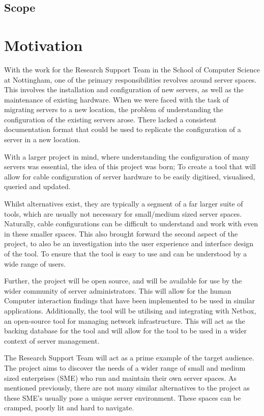 \documentclass [12pt,letterpaper]{article}
\begin{document}
\subsection{Scope}
\label{sec:scope}


\section{Motivation}
With the work for the Research Support Team in the School of Computer Science at Nottingham, one of the primary responsibilities revolves around server spaces. This involves the installation and configuration of new servers, as well as the maintenance of existing hardware. When we were faced with the task of migrating servers to a new location, the problem of understanding the configuration of the existing servers arose. There lacked a consistent documentation format that could be used to replicate the configuration of a server in a new location.

With a larger project in mind, where understanding the configuration of many servers was essential, the idea of this project was born; To create a tool that will allow for cable configuration of server hardware to be easily digitised, visualised, queried and updated.

Whilst alternatives exist, they are typically a segment of a far larger suite of tools, which are usually not necessary for small/medium sized server spaces. Naturally, cable configurations can be difficult to understand and work with even in these smaller spaces. This also brought forward the second aspect of the project, to also be an investigation into the user experience and interface design of the tool. To ensure that the tool is easy to use and can be understood by a wide range of users.

Further, the project will be open source, and will be available for use by the wider community of server administrators. This will allow for the human Computer interaction findings that have been implemented to be used in similar applications. Additionally, the tool will be utilising and integrating with Netbox, an open-source tool for managing network infrastructure. This will act as the backing database for the tool and will allow for the tool to be used in a wider context of server management.

The Research Support Team will act as a prime example of the target audience. The project aims to discover the needs of a wider range of small and medium sized enterprises (SME) who run and maintain their own server spaces. As mentioned previously, there are not many similar alternatives to the project as these SME's usually pose a unique server environment. These spaces can be cramped, poorly lit and hard to navigate.
\end{document}
